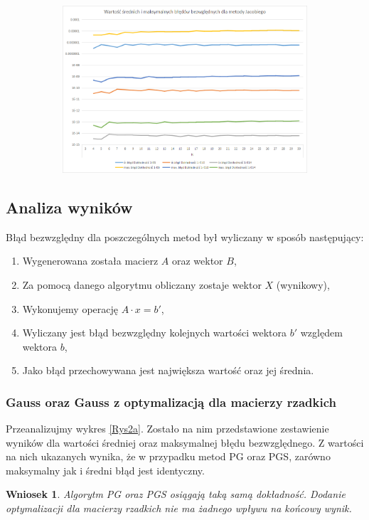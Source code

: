 \documentclass[10pt]{article}
\newtheorem{wn}{Wniosek}
\begin{document}
\begin{figure}[h]
\begin{subfigure}{0.5\textwidth}
	\includegraphics[width=\textwidth]{4.png}
	\caption{ \label{Rys2c}}
	\end{subfigure}
\end{figure}
\subsection{Analiza wyników}
Błąd bezwzględny dla poszczególnych metod był wyliczany w sposób następujący:
\begin{enumerate}
	\item Wygenerowana została macierz $A$ oraz wektor $B$,
	\item Za pomocą danego algorytmu obliczany zostaje wektor $X$ (wynikowy),
	\item Wykonujemy operację $A\cdot x = b'$,
	\item Wyliczany jest błąd bezwzględny kolejnych wartości wektora $b'$ względem wektora $b$,
	\item Jako błąd przechowywana jest największa wartość oraz jej średnia.
\end{enumerate}
\subsubsection{Gauss oraz Gauss z optymalizacją dla macierzy rzadkich}
Przeanalizujmy wykres \ref{Rys2a}. Zostało na nim przedstawione zestawienie wyników dla wartości średniej oraz maksymalnej błędu bezwzględnego. Z wartości na nich ukazanych wynika, że w przypadku metod PG oraz PGS, zarówno maksymalny jak i średni błąd jest identyczny.
\begin{wn}
	Algorytm PG oraz PGS osiągają taką samą dokładność. Dodanie optymalizacji dla macierzy rzadkich nie ma żadnego wpływu na końcowy wynik.\label{wn:2}
\end{wn}
\end{document}
